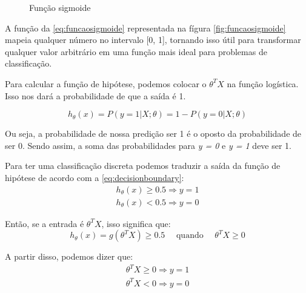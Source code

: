 \begin{figure}[!htb]
  \caption{Função sigmoide}
  \label{fig:funcaosigmoide}
  \begin{center}
  \end{center}
\end{figure}

A função da \autoref{eq:funcaosigmoide} representada na fígura \autoref{fig:funcaosigmoide} mapeia qualquer número no intervalo [0, 1], tornando isso útil para transformar qualquer valor arbitrário em uma função mais ideal para problemas de classificação.

Para calcular a função de hipótese, podemos colocar o $\theta^TX$ na função logística. Isso nos dará a probabilidade de que a saída é 1.

\begin{equation}
h_{\theta}(x) = P(y=1 | X ; \theta) = 1 - P(y=0 | X ; \theta) \nonumber
\end{equation}

Ou seja, a probabilidade de nossa predição ser 1 é o oposto da probabilidade de ser 0. Sendo assim, a soma das probabilidades para \textit{y = 0} e \textit{y = 1} deve ser 1.

Para ter uma classificação discreta podemos traduzir a saída da função de hipótese de acordo com a \autoref{eq:decisionboundary}:
\begin{align} 
h_{\theta}(x) \geq 0.5 \Rightarrow y = 1 \nonumber \\
h_{\theta}(x) < 0.5 \Rightarrow y = 0 \label{eq:decisionboundary}
\end{align}

Então, se a entrada é $\theta^TX$, isso significa que:
\begin{equation}
h_{\theta}(x) = g(\theta^TX) \geq 0.5 \quad \text{ quando } \quad \theta^TX \geq 0 \nonumber
\end{equation}

A partir disso, podemos dizer que:
\begin{align}
\theta^TX \geq 0 \Rightarrow y = 1 \nonumber \\
\theta^TX < 0 \Rightarrow y = 0 \nonumber
\end{align}

